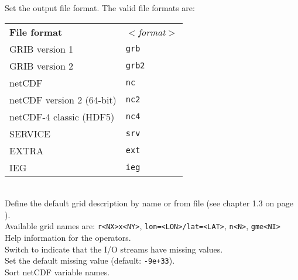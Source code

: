 \begin{tabbing}
         \> Set the output file format. The valid file formats are: \\
         \> \parbox[r]{3in}{
              \vspace*{1mm}
              \hspace*{0cm}\begin{tabular}{|l|l|}
              \hline
              \rowcolor[gray]{.9}
              {\bf File format}          & \sl $<$format$>$ \\
               GRIB version 1            & {\tt grb}  \\
               GRIB version 2            & {\tt grb2} \\
               netCDF                    & {\tt nc}   \\
               netCDF version 2 (64-bit) & {\tt nc2}  \\
               netCDF-4 classic (HDF5)   & {\tt nc4}  \\
               SERVICE                   & {\tt srv}  \\
               EXTRA                     & {\tt ext}  \\
               IEG                       & {\tt ieg}  \\
              \hline
              \end{tabular}
              \vspace*{1mm}
            } \\
         \> Define the default grid description by name or from file (see chapter 1.3 on page \pageref{GRID_DESCRIPTION}). \\
         \> Available grid names are: {\tt r<NX>x<NY>}, {\tt lon=<LON>/lat=<LAT>}, {\tt n<N>}, {\tt gme<NI>} \\
         \> Help information for the operators. \\
         \> Switch to indicate that the I/O streams have missing values. \\
         \> Set the default missing value (default: {\tt-9e+33}). \\
         \> Sort netCDF variable names. \\

\end{tabbing}
